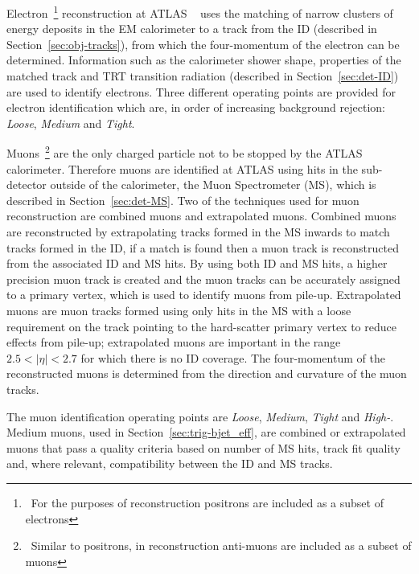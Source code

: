 Electron~\footnote{\ For the purposes of reconstruction positrons are included as a subset of electrons}
reconstruction at ATLAS ~\cite{obj-electrons} uses
the matching of narrow clusters of energy deposits in the EM calorimeter
to a track from the ID (described in Section~\ref{sec:obj-tracks}),
from which the four-momentum of the electron can be determined.
Information such as the calorimeter shower shape,
properties of the matched track
and TRT transition radiation (described in Section~\ref{sec:det-ID})
are used to identify electrons.
Three different operating points are provided for electron identification
which are, in order of increasing background rejection:
\textit{Loose}, \textit{Medium} and \textit{Tight}. 

Muons~\footnote{\ Similar to positrons, in reconstruction anti-muons are included as a subset of muons}
are the only charged particle not to be stopped by the ATLAS calorimeter.
Therefore muons are identified at ATLAS using hits in the sub-detector outside of the calorimeter, the Muon Spectrometer (MS), which is described in Section~\ref{sec:det-MS}.
Two of the techniques used for muon reconstruction are combined muons and extrapolated muons.
Combined muons are reconstructed by extrapolating tracks formed in the MS inwards to match tracks formed in the ID,
if a match is found then a muon track is reconstructed from the associated ID and MS hits.
By using both ID and MS hits, a higher precision muon track is created
and the muon tracks can be accurately assigned to a primary vertex, which is used to identify muons from pile-up.
Extrapolated muons are muon tracks formed using only hits in the MS
with a loose requirement on the track pointing to the hard-scatter primary vertex to reduce effects from pile-up;
extrapolated muons are important in the range $2.5 < |\eta| < 2.7$ for which there is no ID coverage.
The four-momentum of the reconstructed muons is determined from the direction and curvature of the muon tracks.

The muon identification operating points are \textit{Loose}, \textit{Medium}, \textit{Tight} and \textit{High-\pT{}}.
Medium muons, used in Section~\ref{sec:trig-bjet_eff}, are combined or extrapolated muons that pass a quality criteria based on
number of MS hits, track fit quality and, where relevant, compatibility between the ID and MS tracks.

